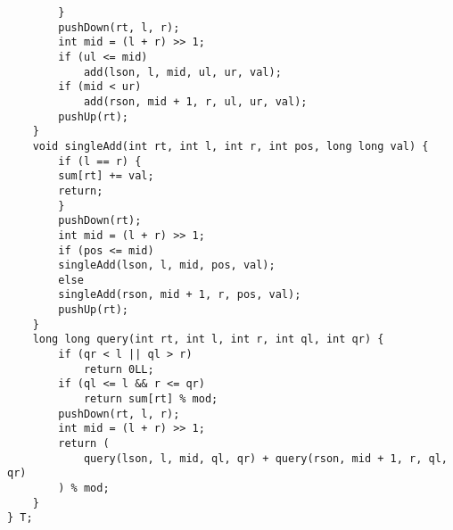\begin{verbatim}
        }
        pushDown(rt, l, r);
        int mid = (l + r) >> 1;
        if (ul <= mid)
            add(lson, l, mid, ul, ur, val);
        if (mid < ur)
            add(rson, mid + 1, r, ul, ur, val);
        pushUp(rt);
    }
    void singleAdd(int rt, int l, int r, int pos, long long val) {
        if (l == r) {
        sum[rt] += val;
        return;
        }
        pushDown(rt);
        int mid = (l + r) >> 1;
        if (pos <= mid)
        singleAdd(lson, l, mid, pos, val);
        else
        singleAdd(rson, mid + 1, r, pos, val);
        pushUp(rt);
    }
    long long query(int rt, int l, int r, int ql, int qr) {
        if (qr < l || ql > r)
            return 0LL;
        if (ql <= l && r <= qr)
            return sum[rt] % mod;
        pushDown(rt, l, r);
        int mid = (l + r) >> 1;
        return (
            query(lson, l, mid, ql, qr) + query(rson, mid + 1, r, ql, qr)
        ) % mod;
    }
} T;
\end{verbatim}

